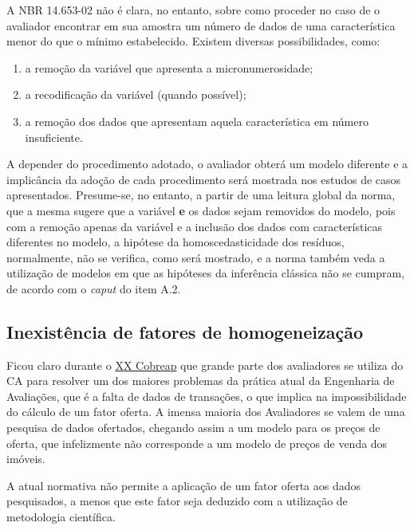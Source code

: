 \documentclass[
  a4paper, 11pt]{article}
\providecommand{\tightlist}{%
  \setlength{\itemsep}{0pt}\setlength{\parskip}{0pt}}
\begin{document}
A NBR 14.653-02 não é clara, no entanto, sobre como proceder no caso de
o avaliador encontrar em sua amostra um número de dados de uma
característica menor do que o mínimo estabelecido. Existem diversas
possibilidades, como:

\begin{enumerate}
\def\labelenumi{\alph{enumi}.}
\tightlist
\item
  a remoção da variável que apresenta a micronumerosidade;
\item
  a recodificação da variável (quando possível);
\item
  a remoção dos dados que apresentam aquela característica em número
  insuficiente.
\end{enumerate}

A depender do procedimento adotado, o avaliador obterá um modelo
diferente e a implicância da adoção de cada procedimento será mostrada
nos estudos de casos apresentados. Presume-se, no entanto, a partir de
uma leitura global da norma, que a mesma sugere que a variável
\textbf{e} os dados sejam removidos do modelo, pois com a remoção apenas
da variável e a inclusão dos dados com características diferentes no
modelo, a hipótese da homoscedasticidade dos resíduos, normalmente, não
se verifica, como será mostrado, e a norma também veda a utilização de
modelos em que as hipóteses da inferência clássica não se cumpram, de
acordo com o \emph{caput} do item A.2.

\hypertarget{inexistuxeancia-de-fatores-de-homogeneizauxe7uxe3o}{%
\subsection{Inexistência de fatores de
homogeneização}\label{inexistuxeancia-de-fatores-de-homogeneizauxe7uxe3o}}

Ficou claro durante o \href{http://www.cobreap.com.br/2019/}{XX Cobreap}
que grande parte dos avaliadores se utiliza do CA para resolver um dos
maiores problemas da prática atual da Engenharia de Avaliações, que é a
falta de dados de transações, o que implica na impossibilidade do
cálculo de um fator oferta. A imensa maioria dos Avaliadores se valem de
uma pesquisa de dados ofertados, chegando assim a um modelo para os
preços de oferta, que infelizmente não corresponde a um modelo de preços
de venda dos imóveis.

A atual normativa não permite a aplicação de um fator oferta aos dados
pesquisados, a menos que este fator seja deduzido com a utilização de
metodologia científica.
\end{document}
